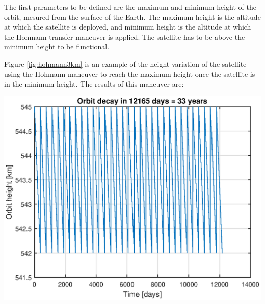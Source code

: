 \noindent
The first parameters to be defined are the maximum and minimum height of the orbit, mesured from the surface of the Earth. The maximum height is the altitude at which the satellite is deployed, and minimum height is the altitude at which the Hohmann transfer maneuver is applied. The satellite has to be above the minimum height to be functional.


Figure \ref{fig:hohmann3km} is an example of the height variation of the satellite using the Hohmann maneuver to reach the maximum height once the satellite is in the minimum height. The results of this maneuver are:

\begin{minipage}{\textwidth}
\begin{minipage}[b]{0.49\textwidth}
\centering
\includegraphics[scale=0.4]{ThrustersDrag/thrust3km.eps}
\label{fig:hohmann3km}
\end{minipage}
\hfill
{}
\end{minipage}

